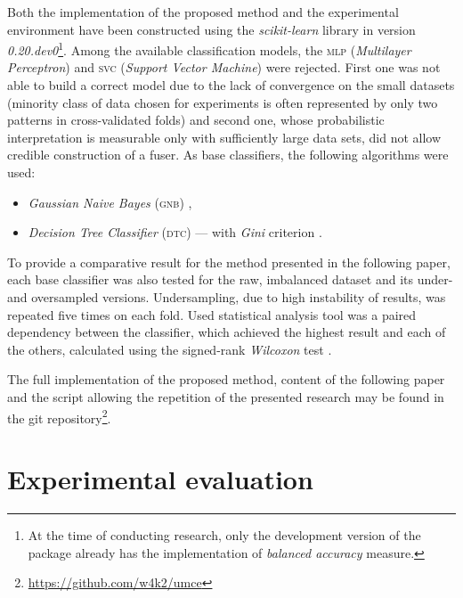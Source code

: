 \documentclass[pmlr]{jmlr}
\begin{document}
Both the implementation of the proposed method and the experimental environment have been constructed using the \emph{scikit-learn} library \citep{scikit-learn} in version \emph{0.20.dev0}\footnote{At the time of conducting research, only the development version of the package already has the implementation of \emph{balanced accuracy} measure.}. Among the available classification models, the \textsc{mlp} (\emph{Multilayer Perceptron}) and \textsc{svc} (\emph{Support Vector Machine}) were rejected. First one was not able to build a correct model due to the lack of convergence on the small datasets (minority class of data chosen for experiments is often represented by only two patterns in cross-validated folds) and second one, whose probabilistic interpretation is measurable only with sufficiently large data sets, did not allow credible construction of a fuser. As base classifiers, the following algorithms were used:

\begin{itemize}
	\item \emph{Gaussian Naive Bayes} (\textsc{gnb}) \citep{gnb},
	\item \emph{Decision Tree Classifier} (\textsc{dtc}) --- with \emph{Gini} criterion \citep{loh2011classification}.
\end{itemize}

To provide a comparative result for the method presented in the following paper, each base classifier was also tested for the raw, imbalanced dataset and its under- and oversampled versions. Undersampling, due to high instability of results, was repeated five times on each fold. Used statistical analysis tool was a paired dependency between the classifier, which achieved the highest result and each of the others, calculated using the signed-rank \emph{Wilcoxon} test \citep{wilcoxon1945individual}.

The full implementation of the proposed method, content of the following paper and the script allowing the repetition of the presented research may be found in the git repository\footnote{\url{https://github.com/w4k2/umce}}.

\section{Experimental evaluation}
\label{sec:intro}
\end{document}
